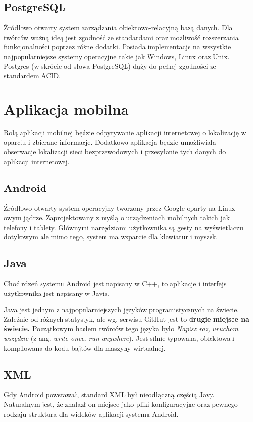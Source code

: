 \subsection{PostgreSQL}
Źródłowo otwarty system zarządzania obiektowo-relacyjną bazą danych. Dla twórców ważną ideą jest zgodność ze standardami oraz możliwość rozszerzania funkcjonalności poprzez różne dodatki. Posiada implementacje na wszystkie najpopularniejsze systemy operacyjne takie jak Windows, Linux oraz Unix. Postgres (w skrócie od słowa PostgreSQL) dąży do pełnej zgodności ze standardem ACID.\cite{PostgresWiki}

\section{Aplikacja mobilna}
Rolą aplikacji mobilnej będzie odpytywanie aplikacji internetowej o lokalizację w oparciu i zbierane informacje. Dodatkowo aplikacja będzie umożliwiała obserwacje lokalizacji sieci bezprzewodowych i przesyłanie tych danych do aplikacji internetowej.

\subsection{Android}
Źródłowo otwarty system operacyjny tworzony przez Google oparty na Linux-owym jądrze. Zaprojektowany z myślą o urządzeniach mobilnych takich jak telefony i tablety. Głównymi narzędziami użytkownika są gesty na wyświetlaczu dotykowym ale mimo tego, system ma wsparcie dla klawiatur i myszek.\cite{AndroidWiki}

\subsection{Java}
Choć rdzeń systemu Android jest napisany w C++, to aplikacje i interfejs użytkownika jest napisany w Javie.\cite{AndroidWiki}

Java jest jednym z najpopularniejszych języków programistycznych na świecie. Zależnie od różnych statystyk, ale wg. serwisu GitHut jest to \textbf{drugie miejsce na świecie.}\cite{GithutStats2017} Początkowym hasłem twórców tego języka było \textit{Napisz raz, uruchom wszędzie} (z ang. \textit{write once, run anywhere}). Jest silnie typowana, obiektowa i kompilowana do kodu bajtów dla maszyny wirtualnej.\cite{JavaWiki}

\subsection{XML}
Gdy Android powstawał, standard XML był nieodłączną częścią Javy. Naturalnym jest, że znalazł on miejsce jako pliki konfiguracyjne oraz pewnego rodzaju struktura dla widoków aplikacji systemu Android.

